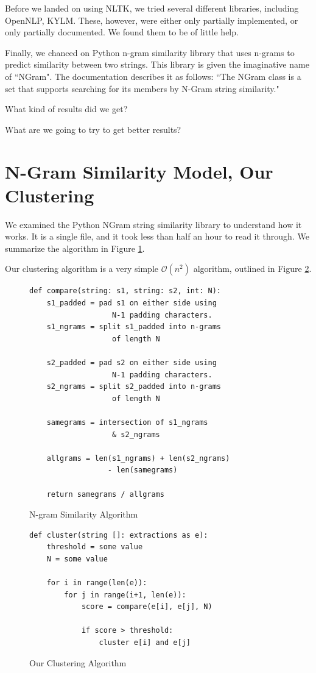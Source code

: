 \documentclass{article}
\begin{document}
Before we landed on using NLTK, we tried several different libraries, including OpenNLP, KYLM. These, however, were either only partially implemented, or only partially documented. We found them to be of little help.

Finally, we chanced on Python n-gram similarity library that uses n-grams to predict similarity between two strings. This library is given the imaginative name of ``NGram". The documentation describes it as follows: ``The NGram class is a set that supports searching for its members by N-Gram string similarity." \cite{py_ngram_lib}





What kind of results did we get?

What are we going to try to get better results?


\section{N-Gram Similarity Model, Our Clustering}
We examined the Python NGram string similarity library to understand how it works. It is a single file, and it took less than half an hour to read it through. We summarize the algorithm in Figure \ref{algorithm}.

Our clustering algorithm is a very simple $\mathcal{O}(n^2)$ algorithm, outlined in Figure \ref{clustering}.

\begin{figure}
\begin{verbatim}
def compare(string: s1, string: s2, int: N):
	s1_padded = pad s1 on either side using
				   N-1 padding characters.
	s1_ngrams = split s1_padded into n-grams 
				   of length N
	
	s2_padded = pad s2 on either side using
				   N-1 padding characters.
	s2_ngrams = split s2_padded into n-grams 
				   of length N	
	
	samegrams = intersection of s1_ngrams
			 	   & s2_ngrams
	
	allgrams = len(s1_ngrams) + len(s2_ngrams)
			  	  - len(samegrams)
	
	return samegrams / allgrams
\end{verbatim}
\vspace{-20pt}
\caption{N-gram Similarity Algorithm}
\label{algorithm}
\end{figure}

\begin{figure}
\begin{verbatim}
def cluster(string []: extractions as e):
	threshold = some value
	N = some value

	for i in range(len(e)):
		for j in range(i+1, len(e)):
			score = compare(e[i], e[j], N)
			
			if score > threshold:
				cluster e[i] and e[j]
\end{verbatim}
\vspace{-20pt}
\caption{Our Clustering Algorithm}
\label{clustering}
\end{figure}
\end{document}
